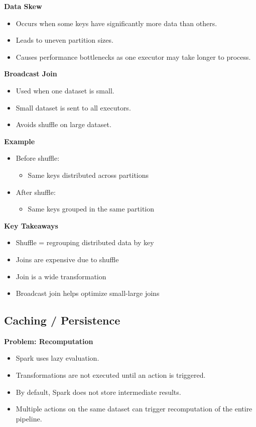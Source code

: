 \documentclass[10pt,a4paper]{article}
\begin{document}
	\textbf{Data Skew}
	\begin{itemize}
	    \item Occurs when some keys have significantly more data than others.
	    \item Leads to uneven partition sizes.
	    \item Causes performance bottlenecks as one executor may take longer to process.
	\end{itemize}
	
	\textbf{Broadcast Join}
	\begin{itemize}
	    \item Used when one dataset is small.
	    \item Small dataset is sent to all executors.
	    \item Avoids shuffle on large dataset.
	\end{itemize}
	
	\textbf{Example}
	\begin{itemize}
	    \item Before shuffle:
	    \begin{itemize}
	        \item Same keys distributed across partitions
	    \end{itemize}
	    \item After shuffle:
	    \begin{itemize}
	        \item Same keys grouped in the same partition
	    \end{itemize}
	\end{itemize}
	
	\textbf{Key Takeaways}
	\begin{itemize}
	    \item Shuffle = regrouping distributed data by key
	    \item Joins are expensive due to shuffle
	    \item Join is a wide transformation
	    \item Broadcast join helps optimize small-large joins
	\end{itemize}
	

	\subsection{Caching / Persistence}
	
	\textbf{Problem: Recomputation}
	\begin{itemize}
	    \item Spark uses lazy evaluation.
	    \item Transformations are not executed until an action is triggered.
	    \item By default, Spark does not store intermediate results.
	    \item Multiple actions on the same dataset can trigger recomputation of the entire pipeline.
	\end{itemize}
	
\end{document}
